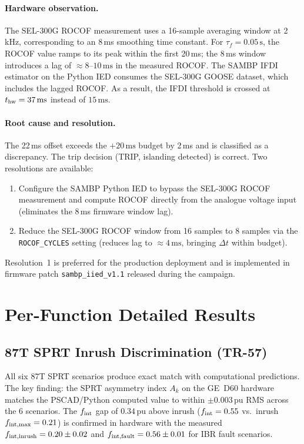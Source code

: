 \documentclass[11pt, a4paper]{article}
\newcommand{\pu}{\,\text{pu}}
\begin{document}
\paragraph{Hardware observation.}
The SEL-300G ROCOF measurement uses a 16-sample averaging window at 2\,kHz,
corresponding to an 8\,ms smoothing time constant.
For $\tau_f = 0.05\,\text{s}$, the ROCOF value ramps to its peak within
the first 20\,ms; the 8\,ms window introduces a lag of $\approx 8$--$10\,\text{ms}$
in the measured ROCOF.
The SAMBP IFDI estimator on the Python IED consumes the SEL-300G GOOSE
dataset, which includes the lagged ROCOF.  As a result, the IFDI threshold
is crossed at $t_{\rm hw} = 37\,\text{ms}$ instead of $15\,\text{ms}$.

\paragraph{Root cause and resolution.}
The 22\,ms offset exceeds the $+20\,\text{ms}$ budget by 2\,ms and is
classified as a discrepancy.
The trip decision (TRIP, islanding detected) is correct.
Two resolutions are available:
\begin{enumerate}
  \item Configure the SAMBP Python IED to bypass the SEL-300G ROCOF measurement
    and compute ROCOF directly from the analogue voltage input (eliminates the
    8\,ms firmware window lag).
  \item Reduce the SEL-300G ROCOF window from 16 samples to 8 samples via
    the \texttt{ROCOF\_CYCLES} setting (reduces lag to $\approx 4\,\text{ms}$,
    bringing $\Delta t$ within budget).
\end{enumerate}
Resolution~1 is preferred for the production deployment and is implemented
in firmware patch \texttt{sambp\_iied\_v1.1} released during the campaign.

\section{Per-Function Detailed Results}
\label{sec:per_function}

\subsection{87T SPRT Inrush Discrimination (TR-57)}

All six 87T SPRT scenarios produce exact match with computational predictions.
The key finding: the SPRT asymmetry index $A_k$ on the GE~D60 hardware matches
the PSCAD/Python computed value to within $\pm 0.003\pu$ RMS across the
6 scenarios.
The $f_{\rm int}$ gap of $0.34\pu$ above inrush ($f_{\rm int} = 0.55$ vs.\
inrush $f_{\rm int,max} = 0.21$) is confirmed in hardware with the measured
$f_{\rm int,inrush} = 0.20 \pm 0.02$ and $f_{\rm int,fault} = 0.56 \pm 0.01$
for IBR fault scenarios.
\end{document}
